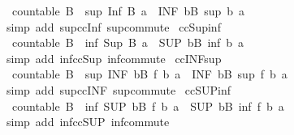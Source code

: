 \begin{isabellebody}
\ \ {\isachardoublequoteopen}countable\ B\ {\isasymLongrightarrow}\ sup\ {\isacharparenleft}Inf\ B{\isacharparenright}\ a\ {\isacharequal}\ {\isacharparenleft}INF\ b{\isacharcolon}B{\isachardot}\ sup\ b\ a{\isacharparenright}{\isachardoublequoteclose}\isanewline
%
\isadelimproof
\ \ %
\endisadelimproof
%
\isatagproof
{}\isamarkupfalse%
\ {\isacharparenleft}simp\ add{\isacharcolon}\ sup{\isacharunderscore}ccInf\ sup{\isacharunderscore}commute{\isacharparenright}%
\endisatagproof
{\isafoldproof}%
%
\isadelimproof
\isanewline
%
\endisadelimproof
\isanewline
{}\isamarkupfalse%
\ ccSup{\isacharunderscore}inf{\isacharcolon}\isanewline
\ \ {\isachardoublequoteopen}countable\ B\ {\isasymLongrightarrow}\ inf\ {\isacharparenleft}Sup\ B{\isacharparenright}\ a\ {\isacharequal}\ {\isacharparenleft}SUP\ b{\isacharcolon}B{\isachardot}\ inf\ b\ a{\isacharparenright}{\isachardoublequoteclose}\isanewline
%
\isadelimproof
\ \ %
\endisadelimproof
%
\isatagproof
{}\isamarkupfalse%
\ {\isacharparenleft}simp\ add{\isacharcolon}\ inf{\isacharunderscore}ccSup\ inf{\isacharunderscore}commute{\isacharparenright}%
\endisatagproof
{\isafoldproof}%
%
\isadelimproof
\isanewline
%
\endisadelimproof
\isanewline
{}\isamarkupfalse%
\ ccINF{\isacharunderscore}sup{\isacharcolon}\isanewline
\ \ {\isachardoublequoteopen}countable\ B\ {\isasymLongrightarrow}\ sup\ {\isacharparenleft}INF\ b{\isacharcolon}B{\isachardot}\ f\ b{\isacharparenright}\ a\ {\isacharequal}\ {\isacharparenleft}INF\ b{\isacharcolon}B{\isachardot}\ sup\ {\isacharparenleft}f\ b{\isacharparenright}\ a{\isacharparenright}{\isachardoublequoteclose}\isanewline
%
\isadelimproof
\ \ %
\endisadelimproof
%
\isatagproof
{}\isamarkupfalse%
\ {\isacharparenleft}simp\ add{\isacharcolon}\ sup{\isacharunderscore}ccINF\ sup{\isacharunderscore}commute{\isacharparenright}%
\endisatagproof
{\isafoldproof}%
%
\isadelimproof
\isanewline
%
\endisadelimproof
\isanewline
{}\isamarkupfalse%
\ ccSUP{\isacharunderscore}inf{\isacharcolon}\isanewline
\ \ {\isachardoublequoteopen}countable\ B\ {\isasymLongrightarrow}\ inf\ {\isacharparenleft}SUP\ b{\isacharcolon}B{\isachardot}\ f\ b{\isacharparenright}\ a\ {\isacharequal}\ {\isacharparenleft}SUP\ b{\isacharcolon}B{\isachardot}\ inf\ {\isacharparenleft}f\ b{\isacharparenright}\ a{\isacharparenright}{\isachardoublequoteclose}\isanewline
%
\isadelimproof
\ \ %
\endisadelimproof
%
\isatagproof
{}\isamarkupfalse%
\ {\isacharparenleft}simp\ add{\isacharcolon}\ inf{\isacharunderscore}ccSUP\ inf{\isacharunderscore}commute{\isacharparenright}%

\end{isabellebody}
